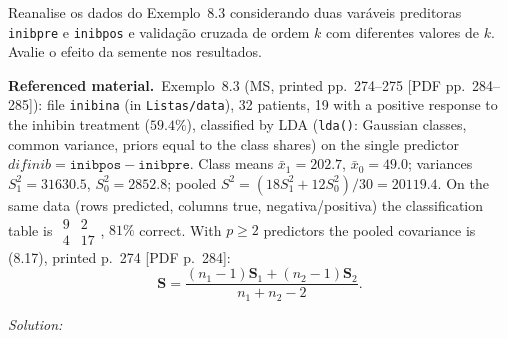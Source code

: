 \documentclass[11pt,a4paper]{article}
\newif\ifsolucoes
\newcommand{\espacoresol}{3.5cm}   %
\numberwithin{equation}{questao}   %
\newenvironment{refmat}{\par\smallskip\noindent\begin{small}\textbf{Referenced material.}\ }{\end{small}\par\smallskip}
\newcommand{\resolespaco}{\ifsolucoes\else\par\textit{Solution:}\vspace{\espacoresol}\par\fi}
\begin{document}
Reanalise os dados do Exemplo~8.3 considerando duas varáveis preditoras \texttt{inibpre} e
\texttt{inibpos} e validação cruzada de ordem $k$ com diferentes valores de $k$. Avalie o efeito da
semente nos resultados.
\begin{refmat}Exemplo~8.3 (MS, printed pp.~274--275 [PDF pp.~284--285]): file \texttt{inibina}
(in \texttt{Listas/data}), 32 patients, 19 with a positive response to the inhibin treatment
($59.4\%$), classified by LDA (\texttt{lda()}: Gaussian classes, common variance, priors equal to the
class shares) on the single predictor $\textit{difinib}=\texttt{inibpos}-\texttt{inibpre}$. Class means
$\bar x_1=202.7$, $\bar x_0=49.0$; variances $S_1^2=31630.5$, $S_0^2=2852.8$; pooled
$S^2=(18S_1^2+12S_0^2)/30=20119.4$. On the same data (rows predicted, columns true, negativa/positiva)
the classification table is $\begin{smallmatrix}9&2\\4&17\end{smallmatrix}$, $81\%$ correct. With
$p\ge2$ predictors the pooled covariance is (8.17), printed p.~274 [PDF p.~284]:
\[\mathbf S=\frac{(n_1-1)\mathbf S_1+(n_2-1)\mathbf S_2}{n_1+n_2-2}.\]\end{refmat}
\resolespaco
\end{document}
